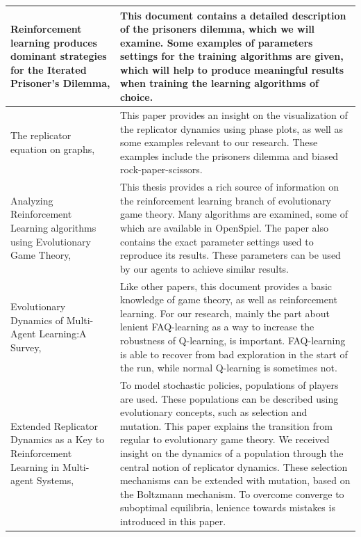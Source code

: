 \documentclass[10pt,a4paper]{article}
\begin{document}
\begin{longtable}{|p{4cm}|p{12cm}|}
\hline  
Reinforcement learning produces dominant strategies for the Iterated Prisoner’s Dilemma, \citet{rlforpd} & 
This document contains a detailed description of the prisoners dilemma, which we will examine. Some examples of parameters settings for the training algorithms are given, which will help to produce meaningful results when training the learning algorithms of choice.\\ 
\hline 
The replicator equation on graphs, \citet{Ohtsuki2006TheRE} & This paper provides an insight on the visualization of the replicator dynamics using phase plots, as well as some examples relevant to our research. These examples include the prisoners dilemma and biased rock-paper-scissors.\\
\hline
Analyzing Reinforcement Learning algorithms using Evolutionary Game Theory, \citet{bloembergenmaster} & This thesis provides a rich source of information on the reinforcement learning branch of evolutionary game theory. Many algorithms are examined, some of which are available in OpenSpiel. The paper also contains the exact parameter settings used to reproduce its results. These parameters can be used by our agents to achieve similar results. \\
\hline
Evolutionary Dynamics of Multi-Agent Learning:A Survey, \citet{evoldynamics} & Like other papers, this document provides a basic knowledge of game theory, as well as reinforcement learning. For our research, mainly the part about lenient FAQ-learning as a way to increase the robustness of Q-learning, is important. FAQ-learning is able to recover from bad exploration in the start of the run, while normal Q-learning is sometimes not. \\
\hline
Extended Replicator Dynamics as a Key to Reinforcement Learning in Multi-agent Systems, \citet{extrepl} & To model stochastic policies, populations of players are used. These populations can be described using evolutionary concepts, such as selection and mutation. This paper explains the transition from regular to evolutionary game theory. We received insight on the dynamics of a population through the central notion of replicator dynamics. These selection mechanisms can be extended with mutation, based on the Boltzmann mechanism. To overcome converge to suboptimal equilibria, lenience towards mistakes is introduced in this paper.
\\ 
\hline
\end{longtable} 
\end{document}
